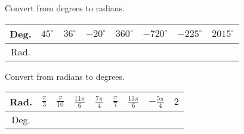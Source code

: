 \begin{frame}
\begin{example}

Convert from degrees to radians.

\begin{tabular}{|c|c|c|c|c|c|c|c|}\hline
Deg. & $45^{\circ}$& $36^{\circ}$& $-20^\circ$& $360^\circ$& $-720^\circ$& $-225^\circ$& $2015^{\circ}$  \\ \hline 
Rad. &&&&&&& \\ \hline
\end{tabular}
\end{example}

\begin{example}

Convert from radians to degrees.

\begin{tabular}{|c|c|c|c|c|c|c|c|c|}\hline
Rad. & $\frac{\pi}{3} $& $\frac{\pi}{10} $&$\frac{11\pi}{6} $&$\frac{7\pi}{4} $&$\frac{\pi}{7} $&$\frac{13\pi}{6} $&$-\frac{5\pi}{4} $& $2$ \\ \hline
Deg. &&&&&&&& \\ \hline 
\end{tabular}
\end{example}

\end{frame}